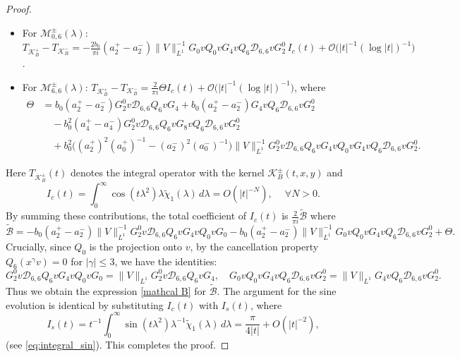 \documentclass[reqno]{amsart}
\numberwithin{equation}{section}
\begin{document}
\begin{proof}
\begin{itemize}
	\item For $\mathcal{M}_{0,6}^{\pm}(\lambda)$:  
	$T_{\mathcal{K}_{B}^{+}} - T_{\mathcal{K}_{B}^{-}} = -\frac{2 b_0}{\pi i}  (a_2^+ - a_2^-)\|V\|_{L^1}^{-1} G_0vQ_0v G_4 vQ_6 \mathcal{D}_{6,6} v G_2^0 \, I_c(t) + \mathcal{O}\!\bigl( |t|^{-1} (\log |t|)^{-1} \bigr)$.  
	
	\item For $\mathcal{M}_{6,6}^{\pm}(\lambda)$:  
	$T_{\mathcal{K}_{B}^{+}} - T_{\mathcal{K}_{B}^{-}} = \frac{2}{\pi i} \Theta I_c(t) + \mathcal{O}\!\bigl( |t|^{-1} (\log |t|)^{-1} \bigr)$, where
	\begin{align*}  
		\Theta &= b_0 (a_2^+ - a_2^-) G_2^0 v \mathcal{D}_{6,6} Q_6 vG_4 + b_0 (a_2^+ - a_2^-) G_4 vQ_6 \mathcal{D}_{6,6} v G_2^0 \\  
		&\quad - b_0^2(a_4^+ - a_4^-) G_2^0 v \mathcal{D}_{6,6} Q_6 v G_8 v Q_6 \mathcal{D}_{6,6} v G_2^0 \\  
		&\quad + b_0^2 \bigl((a_2^+)^2 (a_0^+)^{-1} - (a_2^-)^2 (a_0^-)^{-1}\bigr) \|V\|_{L^1}^{-1}  G_2^0 v \mathcal{D}_{6,6} Q_6 v G_4 v Q_0 v G_4 v Q_6 \mathcal{D}_{6,6} v G_2^0.
	\end{align*}  
\end{itemize} 
	Here  $T_{\mathcal{K}_{B}^{\pm}}(t)$ denotes the integral operator with the kernel ${\mathcal{K}_{B}^{\pm}}(t,x,y)$ and
	$$I_c(t) = \int_0^\infty \cos(t\lambda^2) \lambda \widetilde{\chi}_1(\lambda) \, d\lambda = O(|t|^{-N}), \  \quad\forall N>0.$$
	By summing these contributions, the total coefficient of $I_c(t)$ is $\frac{2}{\pi i}\widetilde{\mathcal{B}}$ where
	$$  
	\widetilde{\mathcal{B}} = -b_0 (a_2^+ - a_2^-)\|V\|_{L^1}^{-1} G_2^0 v \mathcal{D}_{6,6} Q_6 vG_4vQ_0vG_0 - b_0 (a_2^+ - a_2^-) \|V\|_{L^1}^{-1} G_0vQ_0v G_4 vQ_6 \mathcal{D}_{6,6} v G_2^0 + \Theta.  
	$$  
	Crucially, since $Q_0$ is the projection onto $v$, by the cancellation property $Q_6(x^\gamma v)= 0$ for $|\gamma| \le 3$, we have the identities: 
	$$G_2^0 v \mathcal{D}_{6,6} Q_6 vG_4vQ_0vG_0 = \|V\|_{L^1}G_2^0 v \mathcal{D}_{6,6} Q_6 vG_4,\quad G_0vQ_0v G_4 vQ_6 \mathcal{D}_{6,6} v G_2^0 = \|V\|_{L^1}G_4 vQ_6 \mathcal{D}_{6,6} v G_2^0.$$  
	Thus we obtain the expression \eqref{mathcal B} for $\widetilde{\mathcal{B}}.$ The argument for the sine evolution is identical by substituting $I_c(t)$ with $I_s(t)$, where $$I_s(t) = t^{-1} \int_0^\infty \sin(t\lambda^2) \lambda^{-1} \widetilde{\chi}_1(\lambda) \, d\lambda = \frac{\pi}{4|t|} + O(|t|^{-2}),$$ (see \eqref{eq:integral_sin}). This completes the proof.  
\end{proof}  
\end{document}
